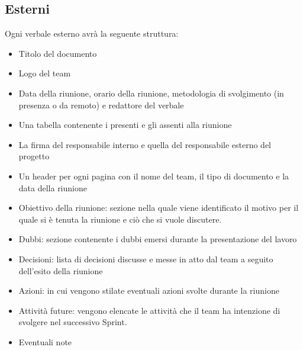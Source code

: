 \documentclass{article}
\begin{document}
\subsection*{Esterni}
Ogni verbale esterno avrà la seguente struttura:
\begin{itemize}
    \item Titolo del documento
    \item Logo del team
    \item Data della riunione, orario della riunione, metodologia di svolgimento (in presenza o da remoto) e redattore del verbale
    \item Una tabella contenente i presenti e gli assenti alla riunione
    \item La firma del responsabile interno e quella del responsabile esterno del progetto
    \item Un header per ogni pagina con il nome del team, il tipo di documento e la data della riunione
    \item Obiettivo della riunione: sezione nella quale viene identificato il motivo per il quale si è tenuta la riunione e ciò che si vuole discutere. 
    \item Dubbi: sezione contenente i dubbi emersi durante la presentazione del lavoro
    \item Decisioni: lista di decisioni discusse e messe in atto dal team a seguito dell'esito della riunione
    \item Azioni: in cui vengono stilate eventuali azioni svolte durante la riunione
    \item Attività future: vengono elencate le attività che il team ha intenzione di svolgere nel successivo Sprint. 
    \item Eventuali note
\end{itemize}
\end{document}
